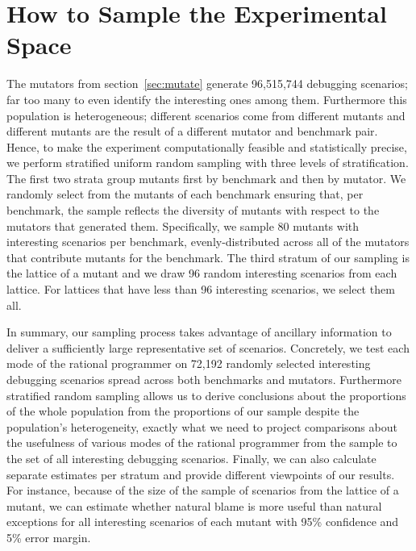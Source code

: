 \section{How to Sample the Experimental Space} 

The mutators from section~\ref{sec:mutate} generate 96,515,744 debugging
scenarios; far too many to even identify the interesting ones among them.
Furthermore this population is heterogeneous; different scenarios come
from different mutants and different mutants are the result of a
different mutator and benchmark pair. Hence, to make the experiment
computationally feasible and statistically precise, we perform stratified
uniform random sampling with three levels of stratification.  The first
two strata group mutants first by benchmark and then by mutator. 
We randomly select from the mutants of
each benchmark ensuring that, per
benchmark, the sample reflects the diversity of mutants with respect to
the mutators that generated them.  Specifically,  we sample 80 mutants
with interesting scenarios per benchmark,  evenly-distributed across all
of the mutators that contribute mutants for the benchmark.  The third
stratum of our sampling is the lattice of a mutant and we draw 96 random
interesting scenarios from each lattice. For lattices that have less than
96 interesting scenarios, we select them all.

In summary, our sampling process takes advantage of ancillary information
to deliver a  sufficiently large representative set of scenarios.
Concretely, we test each
mode of the rational programmer on 72,192 randomly selected interesting
debugging scenarios spread across both benchmarks and mutators.
Furthermore stratified random sampling allows us to derive conclusions
about the proportions of the whole population from the proportions of
our sample despite the population's heterogeneity, exactly what we need to project comparisons about the
usefulness of various modes of the
rational programmer from the sample to the set of all interesting debugging
scenarios.  Finally, we can also calculate separate estimates per stratum and provide different
viewpoints of our results. For instance, because of the size of the sample
of scenarios from the lattice of a mutant, we can estimate whether natural
blame is more useful than natural exceptions for all interesting scenarios
of each mutant with 95\% confidence and 5\% error margin.

 



